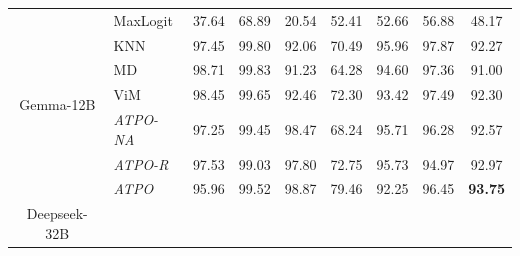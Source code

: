 \begin{table}[t!]
{\begin{tabular}{|c|l|ccccccc|}
\multirow{7}{*}{Gemma-12B}   %
                             &  MaxLogit                    &   37.64  &  68.89  &   20.54  &   52.41  &   52.66  &   56.88  &   \multicolumn{1}{|c|}{48.17}  \\ 
                             &  KNN                     &   97.45  &   99.80  &   92.06  &   70.49  &   95.96  &   97.87  &   \multicolumn{1}{|c|}{92.27}  \\ 
                             &  MD                    &   98.71  &   99.83  &   91.23  &   64.28  &   94.60  &   97.36  &   \multicolumn{1}{|c|}{91.00}  \\ 
                             &  ViM                    &   98.45  &   99.65  &   92.46  &   72.30  &   93.42  &   97.49  &   \multicolumn{1}{|c|}{92.30}  \\ %
                             &  \cellcolor{rowGray} \textit{ATPO-NA}  &  \cellcolor{rowGray} 97.25  &  \cellcolor{rowGray} 99.45  & \cellcolor{rowGray}  98.47  & \cellcolor{rowGray}  68.24  &  \cellcolor{rowGray} 95.71  &  \cellcolor{rowGray} 96.28  &   \multicolumn{1}{|c|}{ \cellcolor{rowGray} 92.57}  \\ %
                             &  \cellcolor{rowGray} \textit{ATPO-R}  &  \cellcolor{rowGray} 97.53  &  \cellcolor{rowGray} 99.03  & \cellcolor{rowGray}  97.80  & \cellcolor{rowGray}  72.75  &  \cellcolor{rowGray} 95.73  &  \cellcolor{rowGray} 94.97  &   \multicolumn{1}{|c|}{ \cellcolor{rowGray} 92.97}  \\ 
                            &  \cellcolor{rowGray} \textit{ATPO}  &  \cellcolor{rowGray} 95.96  & \cellcolor{rowGray} 99.52  &  \cellcolor{rowGray} 98.87  & \cellcolor{rowGray} 79.46  & \cellcolor{rowGray} 92.25  &  \cellcolor{rowGray} 96.45  &  \multicolumn{1}{|c|}{\cellcolor{rowGray} \textbf{93.75}}  \\  \hline
\multirow{7}{*}{Deepseek-32B}   %

\end{tabular}}
\end{table}
